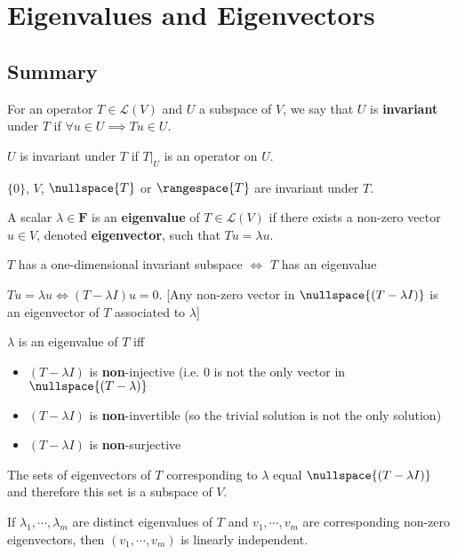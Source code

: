 %

\newpage
\section{Eigenvalues and Eigenvectors}
\subsection*{Summary}
\begin{description}
\item For an operator $T\in\mathcal{L}(V)$ and $U$ a subspace of $V$, we say that $U$ is \textbf{invariant} under $T$ if $\forall u\in U \implies Tu\in U$.
\item $U$ is invariant under $T$ if $T|_U$ is an operator on $U$.
\item $\{0\}$, $V$, $\nullspace{T}$ or $\rangespace{T}$ are invariant under $T$.
%
\item A scalar $\lambda\in \mathbf{F}$ is an \textbf{eigenvalue} of $T\in\mathcal{L}(V)$ if there exists a non-zero vector $u\in V$, denoted \textbf{eigenvector}, such that $Tu=\lambda u$.
\item $T$ has a one-dimensional invariant subspace $\iff$ $T$ has an eigenvalue
\item $Tu = \lambda u \iff (T-\lambda I)u=0$. [Any non-zero vector in $\nullspace{(T-\lambda I)}$ is an eigenvector of $T$ associated to $\lambda$]
\item $\lambda$ is an eigenvalue of $T$ iff
\begin{itemize}
\item $(T-\lambda I)$ is \textbf{non}-injective (i.e. $0$ is not the only vector in $\nullspace{(T-\lambda)}$
\item $(T-\lambda I)$ is \textbf{non}-invertible (so the trivial solution is not the only solution)
\item $(T-\lambda I)$ is \textbf{non}-surjective
\end{itemize}
\item The sets of eigenvectors of $T$ corresponding to $\lambda$ equal $\nullspace{(T-\lambda I)}$ and therefore this set is a subspace of $V$.
%
\item[T6] If $\lambda_1,\cdots,\lambda_m$ are distinct eigenvalues of $T$ and $v_1,\cdots,v_m$ are corresponding non-zero eigenvectors, then $(v_1,\cdots, v_m)$ is linearly independent. 

\end{description}
